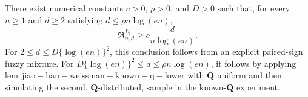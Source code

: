 There exist numerical constants \(c>0\), \(\rho>0\), and \(D>0\) such that, for every \(n\geq1\) and \(d\geq2\) satisfying \(d\leq\rho n\log(en)\),
\[
 \mathfrak R^{L_1}_{n,d}\geq c\frac{d}{n\log(en)}.
\]
For \(2\leq d\leq D\{\log(en)\}^2\), this conclusion follows from an explicit paired-sign fuzzy mixture.  For \(D\{\log(en)\}^2\leq d\leq\rho n\log(en)\), it follows by applying \(\mathrm{lem:jiao-han-weissman-known-q-lower}\) with \(\mathbf Q\) uniform and then simulating the second, \(\mathbf Q\)-distributed, sample in the known-\(\mathbf Q\) experiment.